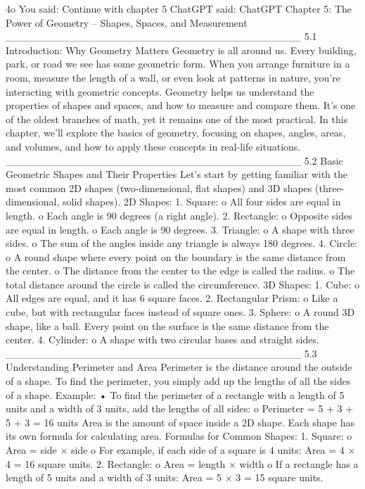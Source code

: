 4o
You said:
Continue with chapter 5
ChatGPT said:
ChatGPT
Chapter 5: The Power of Geometry – Shapes, Spaces, and Measurement
________________________________________
5.1 Introduction: Why Geometry Matters
Geometry is all around us. Every building, park, or road we see has some geometric form. When you arrange furniture in a room, measure the length of a wall, or even look at patterns in nature, you're interacting with geometric concepts.
Geometry helps us understand the properties of shapes and spaces, and how to measure and compare them. It’s one of the oldest branches of math, yet it remains one of the most practical.
In this chapter, we’ll explore the basics of geometry, focusing on shapes, angles, areas, and volumes, and how to apply these concepts in real-life situations.
________________________________________
5.2 Basic Geometric Shapes and Their Properties
Let’s start by getting familiar with the most common 2D shapes (two-dimensional, flat shapes) and 3D shapes (three-dimensional, solid shapes).
2D Shapes:
1.	Square:
o	All four sides are equal in length.
o	Each angle is 90 degrees (a right angle).
2.	Rectangle:
o	Opposite sides are equal in length.
o	Each angle is 90 degrees.
3.	Triangle:
o	A shape with three sides.
o	The sum of the angles inside any triangle is always 180 degrees.
4.	Circle:
o	A round shape where every point on the boundary is the same distance from the center.
o	The distance from the center to the edge is called the radius.
o	The total distance around the circle is called the circumference.
3D Shapes:
1.	Cube:
o	All edges are equal, and it has 6 square faces.
2.	Rectangular Prism:
o	Like a cube, but with rectangular faces instead of square ones.
3.	Sphere:
o	A round 3D shape, like a ball. Every point on the surface is the same distance from the center.
4.	Cylinder:
o	A shape with two circular bases and straight sides.
________________________________________
5.3 Understanding Perimeter and Area
Perimeter is the distance around the outside of a shape. To find the perimeter, you simply add up the lengths of all the sides of a shape.
Example:
•	To find the perimeter of a rectangle with a length of 5 units and a width of 3 units, add the lengths of all sides:
o	Perimeter = 5 + 3 + 5 + 3 = 16 units
Area is the amount of space inside a 2D shape. Each shape has its own formula for calculating area.
Formulas for Common Shapes:
1.	Square:
o	Area = side × side
o	For example, if each side of a square is 4 units: Area = 4 × 4 = 16 square units.
2.	Rectangle:
o	Area = length × width
o	If a rectangle has a length of 5 units and a width of 3 units: Area = 5 × 3 = 15 square units.
